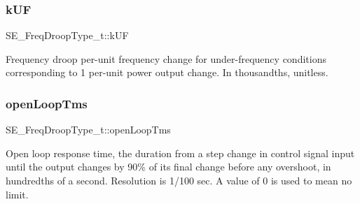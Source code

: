\subsubsection{\texorpdfstring{k\+UF}{kUF}}
{\footnotesize\ttfamily S\+E\+\_\+\+Freq\+Droop\+Type\+\_\+t\+::k\+UF}

Frequency droop per-\/unit frequency change for under-\/frequency conditions corresponding to 1 per-\/unit power output change. In thousandths, unitless. \mbox{\label{group__FreqDroopType_gafca704755da556995f473d9fd5d40383}} 
\subsubsection{\texorpdfstring{open\+Loop\+Tms}{openLoopTms}}
{\footnotesize\ttfamily S\+E\+\_\+\+Freq\+Droop\+Type\+\_\+t\+::open\+Loop\+Tms}

Open loop response time, the duration from a step change in control signal input until the output changes by 90\% of its final change before any overshoot, in hundredths of a second. Resolution is 1/100 sec. A value of 0 is used to mean no limit. 